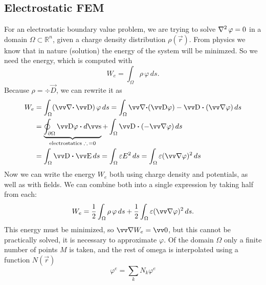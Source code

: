 \documentclass[margin=small]{tex/hsrzf}
\theoremstyle{elmagzf}
\begin{document}
\subsection{Electrostatic FEM}

For an electrostatic boundary value problem, we are trying to solve \(\operatorname{\nabla^2}
\varphi = 0\) in a domain \(\Omega \subset \mathbb{R}^n\), given a charge
density distribution \(\rho(\vec{r})\). From physics we know that in nature
(solution) the energy of the system will be minimzed. So we need the energy,
which is computed with
\[
  W_e = \int_\Omega \rho \, \varphi \, ds.
\]
Because \(\rho = \div \vec{D}\), we can rewrite it as
\begin{align*}
  W_e &= \int_\Omega (\div \vec{D}) \, \varphi \, ds
       = \int_\Omega \div (\vec{D} \varphi) - \vec{D} \dotp (\grad \varphi) \, ds \\
      &= \underbrace{\oint_{\partial \Omega} \vec{D} \varphi \dotp d\vec{s}}_{
      \text{electrostatics } \therefore \, = 0}
         + \int_\Omega \vec{D} \dotp (-\grad \varphi) \, ds \\
      &= \int_\Omega \vec{D} \dotp \vec{E} \, ds
       = \int_\Omega \varepsilon E^2 \, ds
       = \int_\Omega \varepsilon (\grad \varphi)^2 \, ds
\end{align*}
Now we can write the energy \(W_e\) both using charge density and potentials,
as well as with fields. We can combine both into a single expression by taking
half from each:
\begin{equation}
  W_e = \frac{1}{2} \int_\Omega \rho \, \varphi \, ds
        + \frac{1}{2} \int_\Omega \varepsilon (\grad \varphi)^2 \, ds.
\end{equation}
This energy must be minimized, so \(\grad W_e = \vec{0}\), but this cannot be
practically solved, it is necessary to approximate \(\varphi\). Of the domain
\(\Omega\) only a finite number of points \(M\) is taken, and the rest of omega
is interpolated using a function \(N(\vec{r})\)
\begin{equation}
  \varphi^e = \sum_k N_k \varphi^e
\end{equation}
\end{document}
